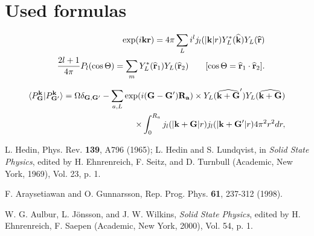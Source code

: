 \documentclass[a4paper,10pt,epsf,fleqn]{article}
\begin{document}
{%
\section{Used formulas}

\begin{eqnarray}
&&\exp( i {\bf k} {\bf r}) = 4 \pi \sum_L i^l 
j_l(|{\bf k}|r)  Y^*_L( {\bf \widehat{ k} }) Y_L(\widehat{{\bf r}}) \\
&&\frac{2l+1}{4 \pi} P_l(\cos\Theta) = \sum_m Y^*_L( {\bf \widehat{r}}_1) 
Y_L({\bf \widehat{r}}_2) \ \ \ \ \ \ 
[\cos \Theta = {\bf \widehat{r}}_1 \cdot {\bf \widehat{r}}_2].
\end{eqnarray}

\begin{eqnarray}
\langle P^{\bf k}_{\bf G}|P^{\bf k}_{{\bf G}'} \rangle
= \Omega \delta_{{\bf G},{\bf G}'} -  
\sum_{a,L} \exp( i ({\bf G}-{\bf G}') {\bf R_a}) \times Y_L(\widehat{{\bf k+G}}') 
Y_L( {\bf \widehat{ k+G} }) \nonumber \\
\times \int_0^{R_a} j_l(|{\bf k+G}|r)j_l(|{\bf k+G}'|r) 4 \pi^2 r^2 dr,
\end{eqnarray}







\newpage
\baselineskip=4mm
\begin{thebibliography}{00}
 L. Hedin, Phys. Rev. {\bf139}, A796 (1965);
 L. Hedin and S. Lundqvist, in {\sl Solid State Physics}, edited by
 H. Ehnrenreich, F. Seitz, and D. Turnbull (Academic, New York, 1969),
 Vol. 23, p. 1.

 F. Araysetiawan and O. Gunnarsson,
 Rep. Prog. Phys. {\bf 61}, 237-312 (1998).

 W. G. Aulbur, L. J\"onsson, and J. W. Wilkins,
 {\sl Solid State Physics}, edited by
 H. Ehnrenreich, F. Saepen (Academic, New York, 2000),
 Vol. 54, p. 1.


\end{thebibliography}}
\end{document}
